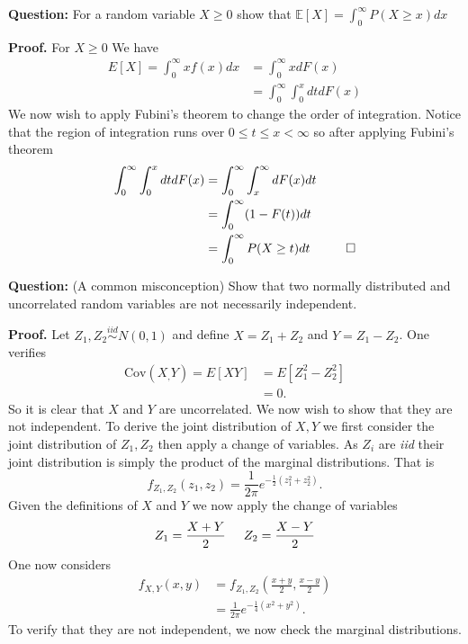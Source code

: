 \documentclass{article}
\begin{document}
\begin{tcolorbox}[colframe=black,colback=gray!5,boxrule=0.5pt]
\textbf{Question:} For a random variable $X\geq0$ show that $\mathbb{E}[X] = \int_{0}^{\infty}P(X\geq x)dx$
\end{tcolorbox}
\textbf{Proof.} For $X\geq0$ We have 
\begin{align*}
    E[X] = \int_{0}^{\infty}xf(x)dx &= \int_{0}^{\infty} x dF(x) \\
    &= \int_{0}^{\infty}\int_{0}^{x}dtdF(x)
\end{align*}
We now wish to apply Fubini's theorem to change the order of integration. Notice that the region of integration runs over $0\leq t\leq x<\infty$ so after applying Fubini's theorem
\begin{align*}
    \int_{0}^{\infty}\int_{0}^{x}dtdF(x) &= \int_{0}^{\infty}\int_{x}^{\infty}dF(x)dt \\
    &=\int_{0}^{\infty}(1 - F(t))dt \\
    &= \int_{0}^{\infty} P(X\geq t)dt \hspace{10mm}
    \square\\
\end{align*}


\begin{tcolorbox}[colframe=black,colback=gray!5,boxrule=0.5pt]
\textbf{Question:} (A common misconception) Show that two normally distributed and uncorrelated random variables are not necessarily independent. 
\end{tcolorbox}
\textbf{Proof.} Let $Z_1,Z_2\stackrel{iid}{\sim}N(0,1)$ and define $X = Z_1 + Z_2$ and  $Y = Z_1 - Z_2$. One verifies 
\begin{align*}
    \text{Cov}(X_, Y) = E[XY] &= E[Z_1^2 -Z_2^2] \\
    &= 0.
\end{align*}
So it is clear that $X$ and $Y$ are uncorrelated. We now wish to show that they are not independent. To derive the joint distribution of $X,Y$ we first consider the joint distribution of $Z_1, Z_2$ then apply a change of variables. As $Z_i$ are \textit{iid} their joint distribution is simply the product of the marginal distributions. That is
$$f_{Z_1, Z_2}(z_1, z_2) = \frac{1}{2\pi}e^{-\frac{1}{2}(z_1^2 + z_2^2)}.$$
Given the definitions of $X$ and $Y$ we now apply the change of variables 
$$Z_1 = \frac{X+Y}{2} \hspace{5mm} Z_2 = \frac{X-Y}{2}$$
One now considers 
\begin{align*}
    f_{X,Y}(x, y) &= f_{Z_1, Z_2}\left(\frac{x+y}{2}, \frac{x-y}{2}\right) \\
    &= \frac{1}{2\pi}e^{-\frac{1}{4}(x^2 + y^2)}.
\end{align*}
To verify that they are not independent, we now check the marginal distributions. 
\end{document}
